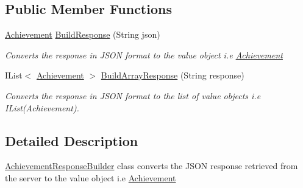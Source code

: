\subsection*{Public Member Functions}
\begin{DoxyCompactItemize}
\item 
\hyperlink{classcom_1_1shephertz_1_1app42_1_1paas_1_1sdk_1_1csharp_1_1achievement_1_1_achievement}{Achievement} \hyperlink{classcom_1_1shephertz_1_1app42_1_1paas_1_1sdk_1_1csharp_1_1achievement_1_1_achievement_response_builder_a1e0a114375334f55ab8dfce0a9f2abff}{Build\+Response} (String json)
\begin{DoxyCompactList}\small\item\em Converts the response in J\+S\+O\+N format to the value object i.\+e \hyperlink{classcom_1_1shephertz_1_1app42_1_1paas_1_1sdk_1_1csharp_1_1achievement_1_1_achievement}{Achievement} \end{DoxyCompactList}\item 
I\+List$<$ \hyperlink{classcom_1_1shephertz_1_1app42_1_1paas_1_1sdk_1_1csharp_1_1achievement_1_1_achievement}{Achievement} $>$ \hyperlink{classcom_1_1shephertz_1_1app42_1_1paas_1_1sdk_1_1csharp_1_1achievement_1_1_achievement_response_builder_a4dc17f17085ee0ba203dec5044ae2ec4}{Build\+Array\+Response} (String response)
\begin{DoxyCompactList}\small\item\em Converts the response in J\+S\+O\+N format to the list of value objects i.\+e I\+List(\+Achievement). \end{DoxyCompactList}\end{DoxyCompactItemize}


\subsection{Detailed Description}
\hyperlink{classcom_1_1shephertz_1_1app42_1_1paas_1_1sdk_1_1csharp_1_1achievement_1_1_achievement_response_builder}{Achievement\+Response\+Builder} class converts the J\+S\+O\+N response retrieved from the server to the value object i.\+e \hyperlink{classcom_1_1shephertz_1_1app42_1_1paas_1_1sdk_1_1csharp_1_1achievement_1_1_achievement}{Achievement} 



